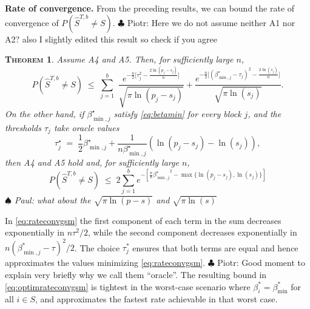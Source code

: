 \documentclass[aos]{imsart}
\theoremstyle{plain}
\newtheorem{thm}{\textsc{Theorem}}[section]
\newcommand{\piotr}[1]{{\small{\color{red} \sf $\clubsuit$ Piotr: #1}}}
\newcommand{\paul}[1]{{\small{\color{green} \sf $\spadesuit$ Paul: #1}}}
\newcommand{\bs}{\boldsymbol}
\begin{document}
\noindent\textbf{Rate of convergence.} From the %
preceding results, we can bound the rate of convergence of $P(\hat S^{T, b}\neq S)$.\piotr{Here we do not assume neither A1 nor A2? also I slightly edited this result so check if you agree} %
\begin{thm}\label{theo:fullrecovGS}
Assume A4 and A5. Then, for sufficiently large $n$,
\begin{equation} \label{eq:rateconvgsm}
P(\hat{S}^{T,b} \neq S)\;\leq\;\sum_{j=1}^b\,\,\frac{e^{-\tfrac{n}{2}\big[\tau_j^2-\tfrac{2\ln(p_j-s_j)}{n}\big]}}{\sqrt{\pi\ln(p_j-s_j)}}+\frac{e^{-\tfrac{n}{2}\big[(\beta^\star_{\min,j}-\tau_j)^2-\tfrac{2\ln(s_j)}{n}\big]}}{\sqrt{\pi\ln(s_j)}}.
\end{equation}
On the other hand, if $\beta^\star_{\min,j}$ satisfy \eqref{eq:betamin} for every block $j$, and the thresholds $\tau_j$ take oracle values
	\begin{equation} \label{eq:optimtauj}
\tau^\star_j \;=\; \frac{1}{2}\beta^\star_{\min,j}+\frac{1}{n\beta^\star_{\min,j}}(\ln({p_j-s_j})-\ln({s_j})),
\end{equation}
then A4 and A5 hold and, for sufficiently large $n$, %
\begin{equation}\label{eq:optimrateconvgsm}
    P(\hat{S}^{T,b} \neq S) \; \leq \; 2 \sum_{j=1}^be^{-[\frac{n}{8}{\beta^\star_{\min,j}}^2-\max\{\ln(p_j-s_j),\ln(s_j)\}]}
\end{equation}
\paul{what about the $\sqrt{\pi\ln(p-s)}$ and $\sqrt{\pi\ln(s)}$}
\end{thm}
In \eqref{eq:rateconvgsm} the first component of each term in the sum decreases exponentially in $n\tau^2/2$, while the second component decreases exponentially in $n(\beta_{\min,j}^*-\tau)^2/2$. The choice $\tau^*_j$ ensures that both terms are equal and hence approximates the values minimizing \eqref{eq:rateconvgsm}.  \piotr{Good moment to explain very briefly why we call them ``oracle''.} 
The resulting bound in \eqref{eq:optimrateconvgsm} is tightest in the worst-case scenario where $\beta_i^*=\beta_{\min}^*$ for all $i \in S$, and approximates the fastest rate achievable in that worst case.
\end{document}
